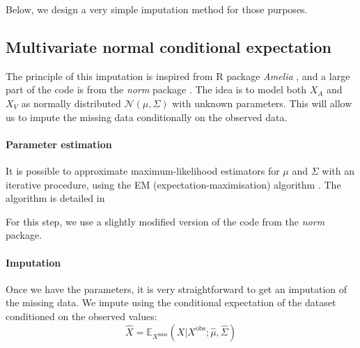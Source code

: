 Below, we design a very simple imputation method for those purposes.

		\subsection{Multivariate normal conditional expectation}
The principle of this imputation is inspired from R package \emph{Amelia} \cite{ref_amelia}, and a large part of the code is from the \emph{norm} package \cite{pkg_norm}. The idea is to model both $X_A$ and $X_V$ as normally distributed $\mathcal{N}(\mu, \Sigma)$ with unknown parameters. This will allow us to impute the missing data conditionally on the observed data.

\paragraph{Parameter estimation}
It is possible to approximate maximum-likelihood estimators for $\mu$ and $\Sigma$ with an iterative procedure, using the EM (expectation-maximisation) algorithm \cite{EM}. The algorithm is detailed in \cite[Chapter 5.3]{em_normal_fit}

 For this step, we use a slightly modified version of the code from the \emph{norm} package.

\paragraph{Imputation}
Once we have the parameters, it is very straightforward to get an imputation of the missing data. We impute using the conditional expectation of the dataset conditioned on the observed values: 
$$\hat{X} = \mathbb{E}_{X^{\text{miss}}}(X \vert X^{\text{obs}} ; \hat{\mu}, \hat{\Sigma})$$


